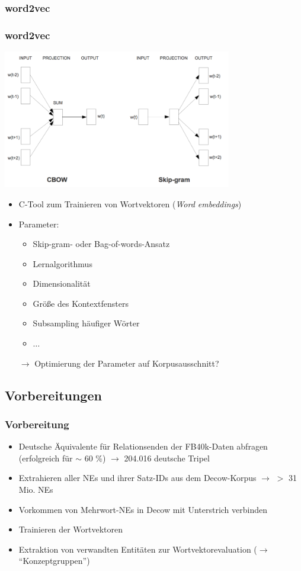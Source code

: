 \documentclass[10pt,xcolor={usenames,dvipsnames,svgnames,table}]{beamer}
\begin{document}
	\begin{frame}
		\subsubsection{word2vec}
		\frametitle{word2vec}
		\begin{center}
			\includegraphics[height=0.4\paperheight, width=0.75\textwidth]{./img/cbow_skipgram.png}
		\end{center}
		\begin{itemize}
			\item C-Tool zum Trainieren von Wortvektoren (\emph{Word embeddings})
			\item Parameter:
			\begin{itemize}
				\item Skip-gram- oder Bag-of-words-Ansatz
				\item Lernalgorithmus
				\item Dimensionalität
				\item Größe des Kontextfensters
				\item Subsampling häufiger Wörter
				\item $\ldots$
			\end{itemize}
			\item[$\rightarrow$] Optimierung der Parameter auf Korpusausschnitt?
		\end{itemize}
	\end{frame}

\begin{frame}
	\subsection{Vorbereitungen}
	\frametitle{Vorbereitung}
	\begin{itemize}
		\item Deutsche Äquivalente für Relationsenden der FB40k-Daten abfragen (erfolgreich für $\sim$ 60 \%) $\rightarrow$ 204.016 deutsche Tripel
		\item Extrahieren aller NEs und ihrer Satz-IDs aus dem Decow-Korpus $\rightarrow$ $>$ 31 Mio. NEs
		\item Vorkommen von Mehrwort-NEs in Decow mit Unterstrich verbinden
		\item Trainieren der Wortvektoren 
		\item Extraktion von verwandten Entitäten zur Wortvektorevaluation ($\rightarrow$ ``Konzeptgruppen'')
	\end{itemize}
\end{frame}
\end{document}
